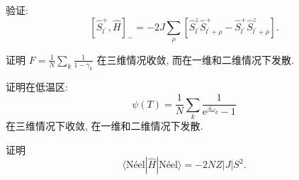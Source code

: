 \begin{question2}{}{}
    验证:
    \begin{equation}
        \left[ \hat{S}_{l^\prime}^+,\hat{H} \right]_-=-2J\sum_\rho\left[ \hat{S}_{l^\prime}^z\hat{S}_{l^\prime+\rho}^+-\hat{S}_{l^\prime}^+\hat{S}_{l^\prime+\rho}^z \right].
    \end{equation}
\end{question2}

\begin{question2}{}{}
    证明 $\displaystyle F=\frac{1}{N}\sum_k\frac{1}{1-\gamma_k}$ 在三维情况收敛, 而在一维和二维情况下发散.
\end{question2}

\begin{question2}{}{}
    证明在低温区:
    \begin{equation}
        \psi(T)=\frac{1}{N}\sum_k\frac{1}{\mathrm{e}^{\beta\omega_k}-1}
    \end{equation}
    在三维情况下收敛, 在一维和二维情况下发散.
\end{question2}

\begin{question2}{}{}
    证明
    \begin{equation}
        \langle\text{Néel}|\hat{H}|\text{Néel}\rangle=-2 N Z|J| S^{2} .
        \end{equation}
\end{question2}

